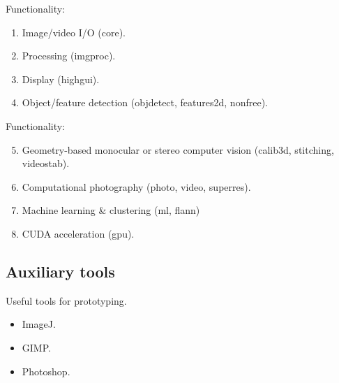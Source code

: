 
\begin{frame}
Functionality:
\begin{enumerate}
\item Image/video I/O (core).
\item Processing (imgproc).
\item Display (highgui).
\item Object/feature detection (objdetect, features2d, nonfree).
\end{enumerate}
\end{frame}


\begin{frame}
Functionality:
\begin{enumerate}
\setcounter{enumi}{4}
\item Geometry-based monocular or stereo computer vision (calib3d, stitching, videostab).
\item Computational photography (photo, video, superres).
\item Machine learning \& clustering (ml, flann)
\item CUDA  acceleration (gpu).
\end{enumerate}
\end{frame}


\subsection{Auxiliary tools}


\begin{frame}
Useful tools for prototyping.
\begin{itemize}
\item ImageJ.
\item GIMP.
\item Photoshop.
\end{itemize}
\end{frame}


